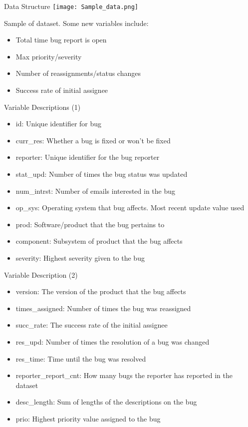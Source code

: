 \documentclass[notes,compress,serif,professionalfont]{beamer}
\begin{document}
\begin{frame}{Data Structure}
    \texttt{[image: Sample\_data.png]}

\bigskip
    Sample of dataset. Some new variables include: \pause
    \begin{itemize}
        \item Total time bug report is open
        \item Max priority/severity
        \item Number of reassignments/status changes
        \item Success rate of initial assignee
    \end{itemize}
\end{frame}

\begin{frame}{Variable Descriptions (1)}
    \begin{itemize}
        \item id: Unique identifier for bug
        \item curr\_res: Whether a bug is fixed or won't be fixed
        \item reporter: Unique identifier for the bug reporter
        \item stat\_upd: Number of times the bug status was updated
        \item num\_intrst: Number of emails interested in the bug
        \item op\_sys: Operating system that bug affects. Most recent update value used
        \item prod: Software/product that the bug pertains to
        \item component: Subsystem of product that the bug affects
        \item severity: Highest severity given to the bug
    \end{itemize}
\end{frame}

\begin{frame}{Variable Description (2)}
    \begin{itemize}
        \item version: The version of the product that the bug affects
        \item times\_assigned: Number of times the bug was reassigned
        \item succ\_rate: The success rate of the initial assignee
        \item res\_upd: Number of times the resolution of a bug was changed
        \item res\_time: Time until the bug was resolved
        \item reporter\_report\_cnt: How many bugs the reporter has reported in the dataset
        \item desc\_length: Sum of lengths of the descriptions on the bug
        \item prio: Highest priority value assigned to the bug
    \end{itemize}
\end{frame}
\end{document}
